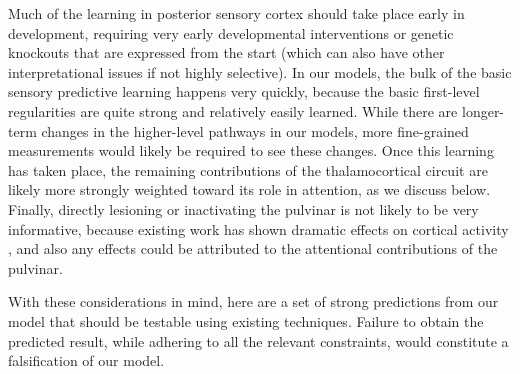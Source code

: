 \documentclass[11pt,twoside]{article}
\newif\myifpdf
\begin{document}
Much of the learning in posterior sensory cortex should take place early in development, requiring very early developmental interventions or genetic knockouts that are expressed from the start (which can also have other interpretational issues if not highly selective).  In our models, the bulk of the basic sensory predictive learning happens very quickly, because the basic first-level regularities are quite strong and relatively easily learned.  While there are longer-term changes in the higher-level pathways in our models, more fine-grained measurements would likely be required to see these changes.  Once this learning has taken place, the remaining contributions of the thalamocortical circuit are likely more strongly weighted toward its role in attention, as we discuss below.  Finally, directly lesioning or inactivating the pulvinar is not likely to be very informative, because existing work has shown dramatic effects on cortical activity \citep{ZhouSchaferDesimone16,PurushothamanMarionLiEtAl12}, and also any effects could be attributed to the attentional contributions of the pulvinar.

With these considerations in mind, here are a set of strong predictions from our model that should be testable using existing techniques.  Failure to obtain the predicted result, while adhering to all the relevant constraints, would constitute a falsification of our model.
\end{document}
